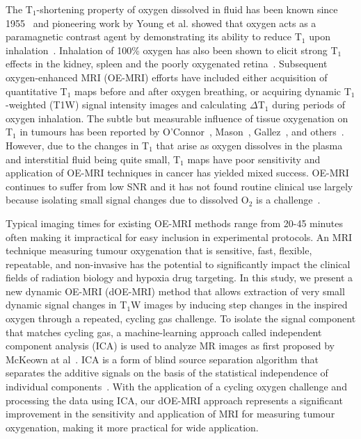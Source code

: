 The T$_1$-shortening property of oxygen dissolved in fluid has been known since 1955~\cite{Chiarotti:1955kf} and pioneering work by Young et al. showed that oxygen acts as a paramagnetic contrast agent by demonstrating its ability to reduce T$_1$ upon inhalation~\cite{Young:1981vf}. 
Inhalation of 100\% oxygen has also been shown to elicit strong T$_1$ effects in the kidney\cite{Jones:2002dh}, spleen\cite{Tadamura:1997vc} and the poorly oxygenated retina~\cite{Berkowitz:2001uz}. 
Subsequent oxygen-enhanced MRI (OE-MRI) efforts have included either acquisition of quantitative T$_1$ maps before and after oxygen breathing, or acquiring dynamic T$_1$-weighted (T1W) signal intensity images and calculating $\Delta$T$_1$ during periods of oxygen inhalation.
The subtle but measurable influence of tissue oxygenation on T$_1$ in tumours has been reported by O'Connor~\cite{OConnor:2016ee,OConnor:2009ku,OConnor:2009bp,Little:2018iu}, Mason~\cite{Zhao:2015ez,White:2016fz,Hallac:2014cb}, Gallez~\cite{Jordan:2012do}, and others~\cite{Tadamura:1997vc,McGrath:2008kx,Kershaw:2010ha,Linnik:2013hf}. 
However, due to the changes in T$_1$ that arise as oxygen dissolves in the plasma and interstitial fluid being quite small, T$_1$ maps have poor sensitivity and application of OE-MRI techniques in cancer has yielded mixed success.
OE-MRI continues to suffer from low \acs{SNR} and it has not found routine clinical use largely because isolating small signal changes due to dissolved O$_2$ is a challenge~\cite{OConnor:2016ee, Zhao:2015ez}.

Typical imaging times for existing OE-MRI methods range from 20-45 minutes often making it impractical for easy inclusion in experimental protocols. 
An MRI technique measuring tumour oxygenation that is sensitive, fast, flexible, repeatable, and non-invasive has the potential to significantly impact the clinical fields of radiation biology and hypoxia drug targeting.
In this study, we present a new dynamic OE-MRI (dOE-MRI) method that allows extraction of very small dynamic signal changes in T$_1$W images by inducing step changes in the inspired oxygen through a repeated, cycling gas challenge.
To isolate the signal component that matches cycling gas, a machine-learning approach called independent component analysis (\acs{ICA}) is used to analyze MR images as first proposed by McKeown at al~\cite{McKeown:1998wo}.
\acs{ICA} is a form of blind source separation algorithm that separates the additive signals on the basis of the statistical independence of individual components~\cite{Hyvarinen:2000vk}.
With the application of a cycling oxygen challenge and processing the data using \acs{ICA}, our \acs{dOE-MRI} approach represents a significant improvement in the sensitivity and application of MRI for measuring tumour oxygenation, making it more practical for wide application.
